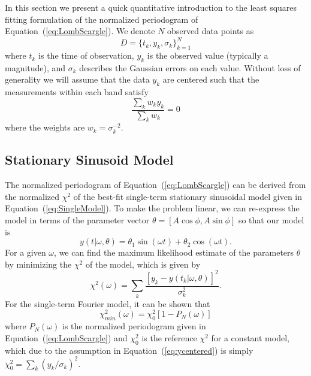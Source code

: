 \documentclass[12pt,preprint]{aastex}
\newcommand{\Eq}[1]{Equation~(\ref{eq:#1})}
\newcommand{\eq}[1]{\Eq{#1}}
\newcommand{\eqlabel}[1]{\label{eq:#1}}
\begin{document}
In this section we present a quick quantitative introduction to the least squares fitting formulation of the normalized periodogram of \eq{LombScargle}. We denote $N$ observed data points as
\begin{equation}
  D = \{t_k, y_k, \sigma_k\}_{k=1}^N
\end{equation}
where $t_k$ is the time of observation, $y_k$ is the observed value (typically a magnitude), and $\sigma_k$ describes the Gaussian errors on each value. Without loss of generality we will assume that the data $y_k$ are centered such that the measurements within each band satisfy
\begin{equation}
  \eqlabel{ycentered}
  \frac{\sum_k w_ky_k}{\sum_k w_k} = 0
\end{equation}
where the weights are $w_k = \sigma_k^{-2}$.

\subsection{Stationary Sinusoid Model}

The normalized periodogram of \eq{LombScargle} can be derived from the normalized $\chi^2$ of the best-fit single-term stationary sinusoidal model given in \eq{SingleModel}. To make the problem linear, we can re-express the model in terms of the parameter vector $\theta = [A\cos\phi, A\sin\phi]$ so that our model is
\begin{equation}
  \eqlabel{simplemodel}
  y(t|\omega,\theta) = \theta_1\sin(\omega t) + \theta_2\cos(\omega t).
\end{equation}
For a given $\omega$, we can find the maximum likelihood estimate of the parameters $\theta$ by minimizing the $\chi^2$ of the model, which is given by
\begin{equation}
  \chi^2(\omega) = \sum_k \frac{[y_k - y(t_k|\omega,\theta)]^2}{\sigma_k^2}.
\end{equation}
For the single-term Fourier model, it can be shown \citep[See, e.g.][]{ICVG2014} that
\begin{equation}
  \eqlabel{chi2PN}
  \chi_{min}^2(\omega) = \chi^2_0[1 - P_N(\omega)]
\end{equation}
where $P_N(\omega)$ is the normalized periodogram given in \eq{LombScargle} and $\chi^2_0$ is the reference $\chi^2$ for a constant model, which due to the assumption in \eq{ycentered} is simply $\chi^2_0 = \sum_k (y_k/\sigma_k)^2$.
\end{document}
